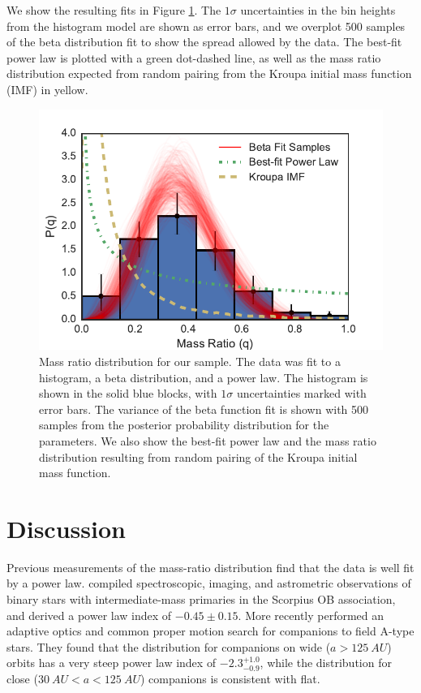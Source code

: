 \documentclass{emulateapj}
\begin{document}
We show the resulting fits in Figure \ref{fig:mrd}. The $1\sigma$ uncertainties in the bin heights from the histogram model are shown as error bars, and we overplot 500 samples of the beta distribution fit to show the spread allowed by the data. The best-fit power law is plotted with a green dot-dashed line, as well as the mass ratio distribution expected from random pairing from the Kroupa initial mass function (IMF) in yellow.


\begin{figure}
\includegraphics[width=\columnwidth]{MRD_total.pdf}
\caption{Mass ratio distribution for our sample. The data was fit to a histogram, a beta distribution, and a power law. The histogram is shown in the solid blue blocks, with $1 \sigma$ uncertainties marked with error bars. The variance of the beta function fit is shown with 500 samples from the posterior probability distribution for the parameters. We also show the best-fit power law and the mass ratio distribution resulting from random pairing of the Kroupa initial mass function.}
\label{fig:mrd}
\end{figure}




\section{Discussion}
\label{sec:discussion}

Previous measurements of the mass-ratio distribution find that the data is well fit by a power law. \citet{Kouwenhoven2007} compiled spectroscopic, imaging, and astrometric observations of binary stars with intermediate-mass primaries in the Scorpius OB association, and derived a power law index of  $-0.45 \pm 0.15$. More recently \citet{DeRosa2014} performed an adaptive optics and common proper motion search for companions to field A-type stars. They found that the distribution for companions on wide ($a > 125\ AU$) orbits has a very steep power law index of $-2.3^{+1.0}_{-0.9}$, while the distribution for close ($30\ AU < a < 125\ AU$) companions is consistent with flat.
\end{document}

